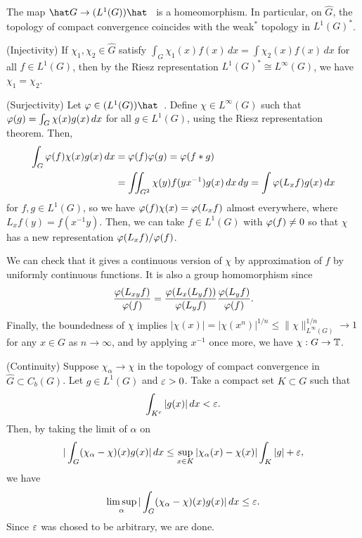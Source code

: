 \documentclass[a4paper]{article}
\begin{document}
\begin{prop}
The map $\hat G\to(L^1(G))\hat\enspace$ is a homeomorphism.
In particular, on $\hat G$, the topology of compact convergence coincides with the weak$^*$ topology in $L^1(G)^*$.
\end{prop}
\begin{pf}
(Injectivity)
If $\chi_1,\chi_2\in\hat G$ satisfy $\int_G\chi_1(x)f(x)\,dx=\int\chi_2(x)f(x)\,dx$ for all $f\in L^1(G)$, then by the Riesz representation $L^1(G)^*\cong L^\infty(G)$, we have $\chi_1=\chi_2$.


(Surjectivity)
Let $\f\in(L^1(G))\hat\enspace$.
Define $\chi\in L^\infty(G)$ such that $\varphi(g)=\int_G\chi(x)g(x)\,dx$ for all $g\in L^1(G)$, using the Riesz representation theorem.
Then,
\begin{align*}
\int_G\varphi(f)\chi(x)g(x)\,dx&=\varphi(f)\varphi(g)=\varphi(f*g)\\
&=\iint_{G^2}\chi(y)f(yx^{-1})g(x)\,dx\,dy=\int\varphi(L_xf)g(x)\,dx
\end{align*}
for $f,g\in L^1(G)$, so we have $\varphi(f)\chi(x)=\varphi(L_xf)$ almost everywhere, where $L_xf(y)=f(x^{-1}y)$.
Then, we can take $f\in L^1(G)$ with $\varphi(f)\ne0$ so that $\chi$ has a new representation $\varphi(L_xf)/\varphi(f)$.

We can check that it gives a continuous version of $\chi$ by approximation of $f$ by uniformly continuous functions.
It is also a group homomorphism since
\[\frac{\varphi(L_{xy}f)}{\varphi(f)}=\frac{\varphi(L_x(L_yf))}{\varphi(L_yf)}\frac{\varphi(L_yf)}{\varphi(f)}.\]
Finally, the boundedness of $\chi$ implies $|\chi(x)|=|\chi(x^n)|^{1/n}\le\|\chi\|_{L^\infty(G)}^{1/n}\to1$ for any $x\in G$ as $n\to\infty$, and by applying $x^{-1}$ once more, we have $\chi:G\to\mathbb{T}$.

(Continuity)
Suppose $\chi_\alpha\to\chi$ in the topology of compact convergence in $\hat G\subset C_b(G)$.
Let $g\in L^1(G)$ and $\varepsilon>0$.
Take a compact set $K\subset G$ such that
\[\int_{K^c}|g(x)|\,dx<\varepsilon.\]
Then, by taking the limit of $\alpha$ on
\[|\int_G(\chi_\alpha-\chi)(x)g(x)|\,dx\le\sup_{x\in K}|\chi_\alpha(x)-\chi(x)|\int_K|g|+\varepsilon,\]
we have
\[\limsup_\alpha|\int_G(\chi_\alpha-\chi)(x)g(x)|\,dx\le\varepsilon.\]
Since $\varepsilon$ was chosed to be arbitrary, we are done.


\end{pf}
\end{document}

